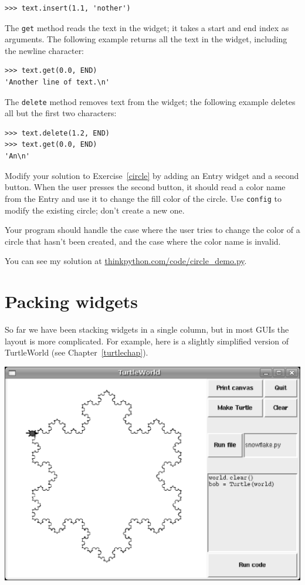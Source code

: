 \documentclass[10pt]{book}
\begin{document}
{\beforeverb
\begin{verbatim}
>>> text.insert(1.1, 'nother')
\end{verbatim}
\afterverb
%
The {\tt get} method reads the text in the widget; it takes a start
and end index as arguments.  The following example returns all the
text in the widget, including the newline character:

\beforeverb
\begin{verbatim}
>>> text.get(0.0, END)
'Another line of text.\n'
\end{verbatim}
\afterverb
%
The {\tt delete} method removes text from the widget;
the following example deletes all but the first two characters:

\beforeverb
\begin{verbatim}
>>> text.delete(1.2, END)
>>> text.get(0.0, END)
'An\n'
\end{verbatim}
\afterverb
%

\begin{ex}
\label{circle2}

Modify your solution to Exercise~\ref{circle} by adding an
Entry widget and a second button.  When the user presses the
second button, it should read a color name from the Entry and
use it to change the fill color of the circle.  Use {\tt config}
to modify the existing circle; don't create a new one.

Your program should handle the case where the user tries to
change the color of a circle that hasn't been created, and
the case where the color name is invalid.

You can see my solution at \url{thinkpython.com/code/circle_demo.py}.

\end{ex}


\section{Packing widgets}

So far we have been stacking widgets in a single column, but in most
GUIs the layout is more complicated.  For example, here is a slightly
simplified version of TurtleWorld (see
Chapter~\ref{turtlechap}).

\beforefig
\centerline{
\includegraphics[width=1.0\textwidth]{figs/TurtleWorld.eps}
}
\afterfig

}
\end{document}
